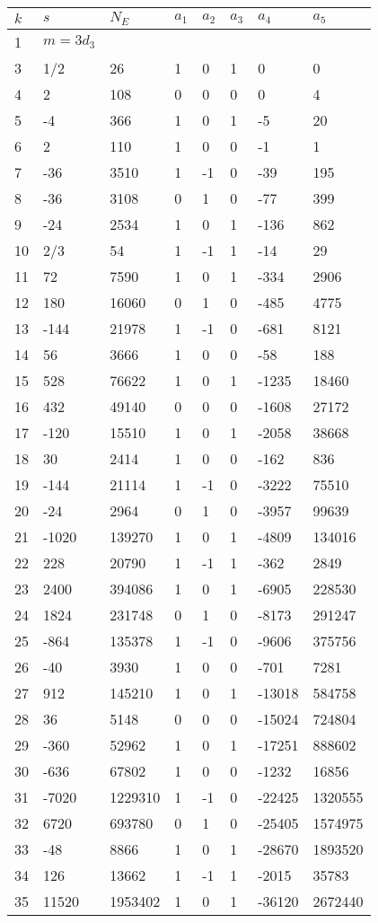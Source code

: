 \documentclass{amsart}
\begin{document}
\begin{longtable}{|l|l|l|lllll|}
\hline
$k$ & $s$ & $N_E$ & $a_1$ & $a_2$ & $a_3$ & $a_4$ & $a_5$\\
\hline
1&$m=3d_{3}$&&\multicolumn{5}{c|}{}\\
3&1/2&26&1&0&1&0&0\\
4&2&108&0&0&0&0&4\\
5&-4&366&1&0&1&-5&20\\
6&2&110&1&0&0&-1&1\\
7&-36&3510&1&-1&0&-39&195\\
8&-36&3108&0&1&0&-77&399\\
9&-24&2534&1&0&1&-136&862\\
10&2/3&54&1&-1&1&-14&29\\
11&72&7590&1&0&1&-334&2906\\
12&180&16060&0&1&0&-485&4775\\
13&-144&21978&1&-1&0&-681&8121\\
14&56&3666&1&0&0&-58&188\\
15&528&76622&1&0&1&-1235&18460\\
16&432&49140&0&0&0&-1608&27172\\
17&-120&15510&1&0&1&-2058&38668\\
18&30&2414&1&0&0&-162&836\\
19&-144&21114&1&-1&0&-3222&75510\\
20&-24&2964&0&1&0&-3957&99639\\
21&-1020&139270&1&0&1&-4809&134016\\
22&228&20790&1&-1&1&-362&2849\\
23&2400&394086&1&0&1&-6905&228530\\
24&1824&231748&0&1&0&-8173&291247\\
25&-864&135378&1&-1&0&-9606&375756\\
26&-40&3930&1&0&0&-701&7281\\
27&912&145210&1&0&1&-13018&584758\\
28&36&5148&0&0&0&-15024&724804\\
29&-360&52962&1&0&1&-17251&888602\\
30&-636&67802&1&0&0&-1232&16856\\
31&-7020&1229310&1&-1&0&-22425&1320555\\
32&6720&693780&0&1&0&-25405&1574975\\
33&-48&8866&1&0&1&-28670&1893520\\
34&126&13662&1&-1&1&-2015&35783\\
35&11520&1953402&1&0&1&-36120&2672440\\

\end{longtable}
\end{document}
